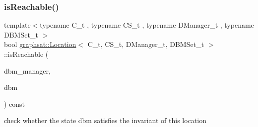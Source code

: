\subsubsection{\texorpdfstring{isReachable()}{isReachable()}}
{\footnotesize\ttfamily template$<$typename C\+\_\+t , typename C\+S\+\_\+t , typename D\+Manager\+\_\+t , typename D\+B\+M\+Set\+\_\+t $>$ \\
bool \mbox{\hyperlink{classgraphsat_1_1_location}{graphsat\+::\+Location}}$<$ C\+\_\+t, C\+S\+\_\+t, D\+Manager\+\_\+t, D\+B\+M\+Set\+\_\+t $>$\+::is\+Reachable (\begin{DoxyParamCaption}\item[{const D\+Manager\+\_\+t \&}]{dbm\+\_\+manager,  }\item[{C\+\_\+t $\ast$}]{dbm }\end{DoxyParamCaption}) const\hspace{0.3cm}{\ttfamily [inline]}}



check whether the state dbm satisfies the invariant of this location 


